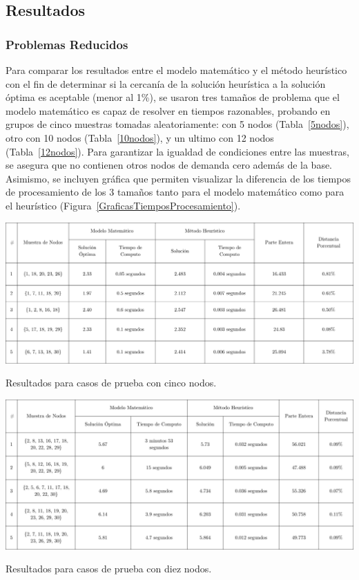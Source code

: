 \documentclass{amsart}
\begin{document}
        \subsection{Resultados}
            \subsubsection{Problemas Reducidos}
            Para comparar los resultados entre el modelo matemático y el método heurístico con el fin de determinar si la cercanía de la solución heurística a la solución óptima es aceptable (menor al 1\%), se usaron tres tamaños de problema que el modelo matemático es capaz de resolver en tiempos razonables, probando en grupos de cinco muestras tomadas aleatoriamente: con 5 nodos (Tabla~\ref{5nodos}), otro con 10 nodos (Tabla~\ref{10nodos}), y un ultimo con 12 nodos (Tabla~\ref{12nodos}). Para garantizar la igualdad de condiciones entre las muestras, se asegura que no contienen otros nodos de demanda cero además de la base. Asimismo, se incluyen gráfica que permiten visualizar la diferencia de los tiempos de procesamiento de los 3 tamaños tanto para el modelo matemático como para el heurístico (Figura~\ref{GraficasTiemposProcesamiento}).

            \begin{table}[ht]
                \centering
                \includegraphics[width=1\linewidth]{Sources/Tabla1.png}
                \caption{Resultados para casos de prueba con cinco nodos.}\label{5nodos}
            \end{table}    

            \begin{table}[ht]
                \centering
                \includegraphics[width=1\linewidth]{Sources/Tabla2.png}
                \caption{Resultados para casos de prueba con diez nodos.}\label{10nodos}
            \end{table}
            
\end{document}
